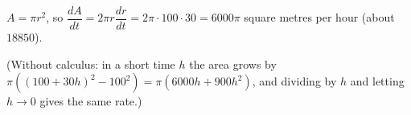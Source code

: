 $A=\pi r^2$, so $\dfrac{dA}{dt}=2\pi r\dfrac{dr}{dt}=2\pi\cdot100\cdot30=\boxed{6000\pi}$ square metres per hour (about $18850$).

(Without calculus: in a short time $h$ the area grows by $\pi\left((100+30h)^2-100^2\right)=\pi(6000h+900h^2)$, and dividing by $h$ and letting $h\to0$ gives the same rate.)
